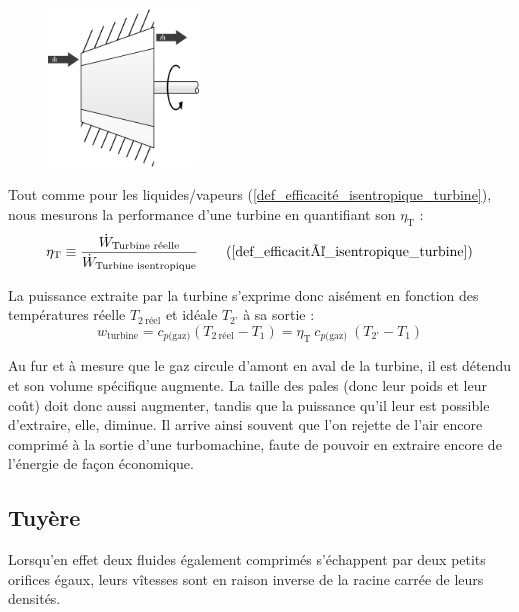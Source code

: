 		\begin{figure}
			\begin{center}
				\includegraphics[width=4cm]{images/symbole_turbine.png}
			\end{center}
			\label{fig_illustration_turbine2}
		\end{figure}

		Tout comme pour les liquides/vapeurs (\ref{def_efficacité_isentropique_turbine}), nous mesurons la performance d’une turbine en quantifiant son  $\eta_\text{T}$ :
		\begin{equation}
			\eta_\text{T} \equiv  \frac{\dot W_\text{Turbine réelle}}{\dot W_\text{Turbine isentropique}}	  \tag{\ref{def_efficacité_isentropique_turbine}}
		\end{equation}

		La puissance extraite par la turbine s’exprime donc aisément en fonction des températures réelle $T_{2~\text{réel}}$ et idéale $T_{2’}$ à sa sortie :
		\begin{equation}
			w_\text{turbine} = c_{p \text{(gaz)}} (T_{2~\text{réel}} - T_1) =  \eta_\text{T} \ c_{p \text{(gaz)}} \ (T_{2’} - T_1)
			\label{eq_puissance_turbine_gaz}
		\end{equation}

		Au fur et à mesure que le gaz circule d’amont en aval de la turbine, il est détendu et son volume spécifique augmente. La taille des pales (donc leur poids et leur coût) doit donc aussi augmenter, tandis que la puissance qu’il leur est possible d’extraire, elle, diminue. Il arrive ainsi souvent que l’on rejette de l’air encore comprimé à la sortie d’une turbomachine, faute de pouvoir en extraire encore de l’énergie de façon économique.


	\subsection{Tuyère}

			Lorsqu’en effet deux fluides également comprimés s’échappent par deux petits orifices égaux, leurs vîtesses sont en raison inverse de la racine carrée de leurs \mbox{densités}.%

